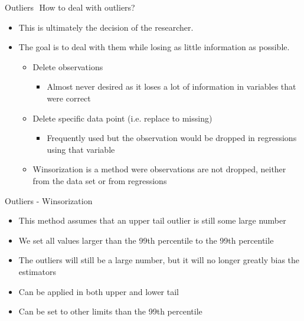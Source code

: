 \documentclass[aspectratio=169]{beamer}
\begin{document}
\begin{frame}{Outliers \newline How to deal with outliers?}
	\begin{itemize}
		\item This is ultimately the decision of the researcher.
		\item The goal is to deal with them while losing as little information as possible.
		\begin{itemize}
			\item Delete observations 
			\begin{itemize}
				\item Almost never desired as it loses a lot of information in variables that were correct
			\end{itemize}
			\item Delete specific data point (i.e. replace to missing)
			\begin{itemize}
				\item Frequently used but the observation would be dropped in regressions using that variable
			\end{itemize}
			\item Winsorization is a method were observations are not dropped, neither from the data set or from regressions			
		\end{itemize}		
	\end{itemize}
\end{frame}

\begin{frame}{Outliers - Winsorization}
	\begin{itemize}
		\item This method assumes that an upper tail outlier is still some large number
		\item We set all values larger than the 99th percentile to the 99th percentile
		\item The outliers will still be a large number, but it will no longer greatly bias the estimators
		\item Can be applied in both upper and lower tail
		\item Can be set to other limits than the 99th percentile
	\end{itemize}
\end{frame}
\end{document}

